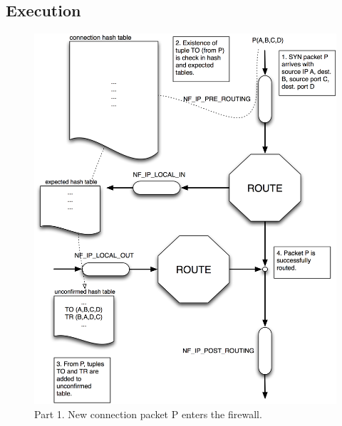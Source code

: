 \documentclass[a4paper,10pt]{article}
\begin{document}
\subsection{Execution}

\begin{figure}[H]
  \centering
  \includegraphics[totalheight=0.90\textheight]{images/conntrack_flow1.png}
  \caption{Part 1. New connection packet P enters the firewall.}\label{fig:conntrack_flow1}
\end{figure}
\end{document}
